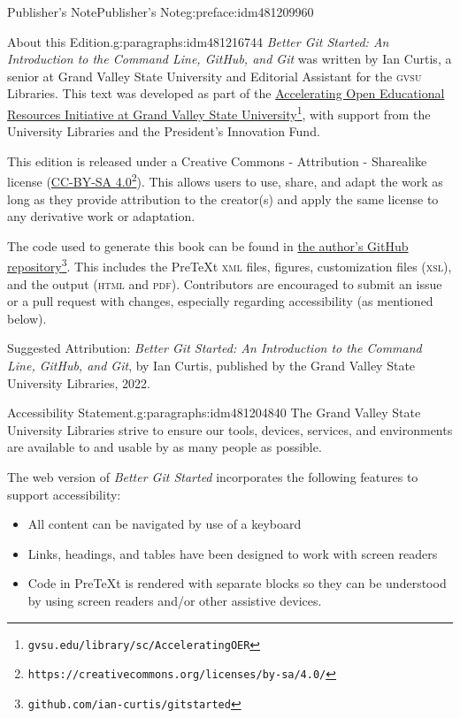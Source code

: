 \documentclass[oneside,10pt,]{book}
\newcommand{\initialism}[1]{\textsc{\MakeLowercase{#1}}}
\newcommand{\pubtitle}[1]{\textsl{#1}}
\begin{document}
\begin{preface}{Publisher's Note}{}{Publisher's Note}{}{}{g:preface:idm481209960}
\begin{paragraphs}{About this Edition.}{g:paragraphs:idm481216744}%
\pubtitle{Better Git Started: An Introduction to the Command Line, GitHub, and Git} was written by Ian Curtis, a senior at Grand Valley State University and Editorial Assistant for the \initialism{GVSU} Libraries. This text was developed as part of the \href{https://www.gvsu.edu/library/sc/AcceleratingOER}{Accelerating Open Educational Resources Initiative at Grand Valley State University}\footnote{\nolinkurl{gvsu.edu/library/sc/AcceleratingOER}\label{g:fn:idm481211112}}, with support from the University Libraries and the President's Innovation Fund.%
\par
This edition is released under a Creative Commons - Attribution - Sharealike license (\href{https://creativecommons.org/licenses/by-sa/4.0/}{CC-BY-SA 4.0}\footnote{\nolinkurl{https://creativecommons.org/licenses/by-sa/4.0/}\label{g:fn:idm481210600}}). This allows users to use, share, and adapt the work as long as they provide attribution to the creator(s) and apply the same license to any derivative work or adaptation.%
\par
The code used to generate this book can be found in \href{https://github.com/ian-curtis/gitstarted}{the author's GitHub repository}\footnote{\nolinkurl{github.com/ian-curtis/gitstarted}\label{g:fn:idm481212264}}. This includes the PreTeXt \initialism{XML} files, figures, customization files (\initialism{XSL}), and the output (\initialism{HTML} and \initialism{PDF}). Contributors are encouraged to submit an issue or a pull request with changes, especially regarding accessibility (as mentioned below).%
\par
Suggested Attribution: \pubtitle{Better Git Started: An Introduction to the Command Line, GitHub, and Git}, by Ian Curtis, published by the Grand Valley State University Libraries, 2022.%
\end{paragraphs}%
\begin{paragraphs}{Accessibility Statement.}{g:paragraphs:idm481204840}%
The Grand Valley State University Libraries strive to ensure our tools, devices, services, and environments are available to and usable by as many people as possible.%
\par
The web version of \pubtitle{Better Git Started} incorporates the following features to support accessibility:%
\begin{itemize}[label=\textbullet]
\item{}All content can be navigated by use of a keyboard%
\item{}Links, headings, and tables have been designed to work with screen readers%
\item{}Code in PreTeXt is rendered with separate blocks so they can be understood by using screen readers and\slash{}or other assistive devices.%
\end{itemize}
%
\end{paragraphs}%
\end{preface}
\end{document}
